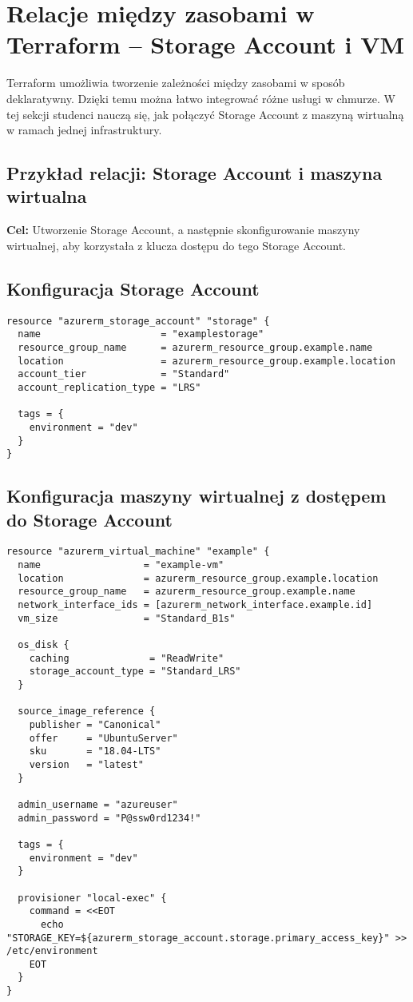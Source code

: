 \documentclass{article}
\begin{document}
\section{Relacje między zasobami w Terraform – Storage Account i VM}
Terraform umożliwia tworzenie zależności między zasobami w sposób deklaratywny. Dzięki temu można łatwo integrować różne usługi w chmurze. W tej sekcji studenci nauczą się, jak połączyć Storage Account z maszyną wirtualną w ramach jednej infrastruktury.

\subsection{Przykład relacji: Storage Account i maszyna wirtualna}
\textbf{Cel:} Utworzenie Storage Account, a następnie skonfigurowanie maszyny wirtualnej, aby korzystała z klucza dostępu do tego Storage Account.

\subsection{Konfiguracja Storage Account}
\begin{lstlisting}
resource "azurerm_storage_account" "storage" {
  name                     = "examplestorage"
  resource_group_name      = azurerm_resource_group.example.name
  location                 = azurerm_resource_group.example.location
  account_tier             = "Standard"
  account_replication_type = "LRS"

  tags = {
    environment = "dev"
  }
}
\end{lstlisting}

\subsection{Konfiguracja maszyny wirtualnej z dostępem do Storage Account}
\begin{lstlisting}
resource "azurerm_virtual_machine" "example" {
  name                  = "example-vm"
  location              = azurerm_resource_group.example.location
  resource_group_name   = azurerm_resource_group.example.name
  network_interface_ids = [azurerm_network_interface.example.id]
  vm_size               = "Standard_B1s"

  os_disk {
    caching              = "ReadWrite"
    storage_account_type = "Standard_LRS"
  }

  source_image_reference {
    publisher = "Canonical"
    offer     = "UbuntuServer"
    sku       = "18.04-LTS"
    version   = "latest"
  }

  admin_username = "azureuser"
  admin_password = "P@ssw0rd1234!"

  tags = {
    environment = "dev"
  }

  provisioner "local-exec" {
    command = <<EOT
      echo "STORAGE_KEY=${azurerm_storage_account.storage.primary_access_key}" >> /etc/environment
    EOT
  }
}
\end{lstlisting}
\end{document}

